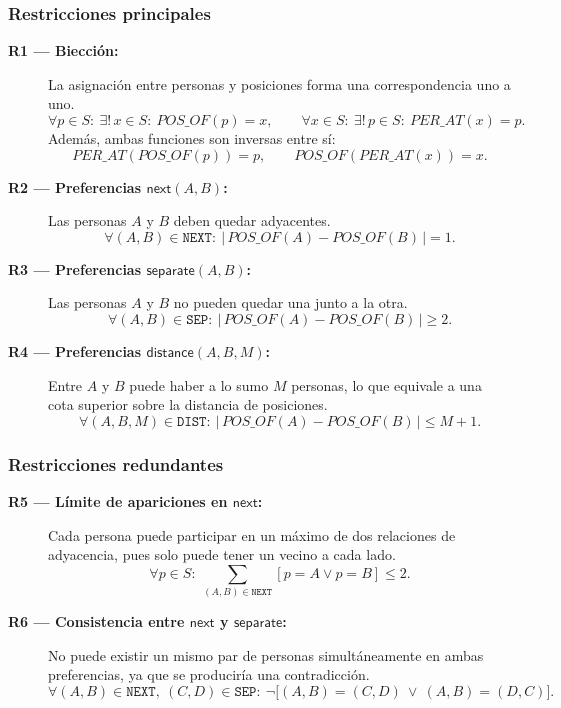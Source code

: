 \subsubsection*{Restricciones principales}
\begin{description}
  \item[\textbf{R1 — Biección:}] La asignación entre personas y posiciones forma una correspondencia uno a uno.  
  \[
  \forall p \in S:\ \exists!\, x \in S:\ POS\_OF(p) = x,
  \qquad
  \forall x \in S:\ \exists!\, p \in S:\ PER\_AT(x) = p.
  \]
  Además, ambas funciones son inversas entre sí:
  \[
  PER\_AT(POS\_OF(p)) = p,\qquad POS\_OF(PER\_AT(x)) = x.
  \]

  \item[\textbf{R2 — Preferencias \(\textsf{next}(A,B)\):}] Las personas \(A\) y \(B\) deben quedar adyacentes.  
  \[
  \forall (A,B) \in \texttt{NEXT}:\ |\,POS\_OF(A) - POS\_OF(B)\,| = 1.
  \]

  \item[\textbf{R3 — Preferencias \(\textsf{separate}(A,B)\):}] Las personas \(A\) y \(B\) no pueden quedar una junto a la otra.  
  \[
  \forall (A,B) \in \texttt{SEP}:\ |\,POS\_OF(A) - POS\_OF(B)\,| \ge 2.
  \]

  \item[\textbf{R4 — Preferencias \(\textsf{distance}(A,B,M)\):}] Entre \(A\) y \(B\) puede haber a lo sumo \(M\) personas, lo que equivale a una cota superior sobre la distancia de posiciones.  
  \[
  \forall (A,B,M) \in \texttt{DIST}:\ |\,POS\_OF(A) - POS\_OF(B)\,| \le M + 1.
  \]
\end{description}

\subsubsection*{Restricciones redundantes}
\begin{description}
  \item[\textbf{R5 — Límite de apariciones en \(\textsf{next}\):}] Cada persona puede participar en un máximo de dos relaciones de adyacencia, pues solo puede tener un vecino a cada lado.  
  \[
  \forall p \in S:\ 
  \sum_{(A,B) \in \texttt{NEXT}} [p = A \vee p = B] \le 2.
  \]

  \item[\textbf{R6 — Consistencia entre \(\textsf{next}\) y \(\textsf{separate}\):}] No puede existir un mismo par de personas simultáneamente en ambas preferencias, ya que se produciría una contradicción.  
  \[
  \forall (A,B) \in \texttt{NEXT},\ (C,D) \in \texttt{SEP}:\ 
  \neg\big[(A,B) = (C,D)\ \vee\ (A,B) = (D,C)\big].
  \]
\end{description}

